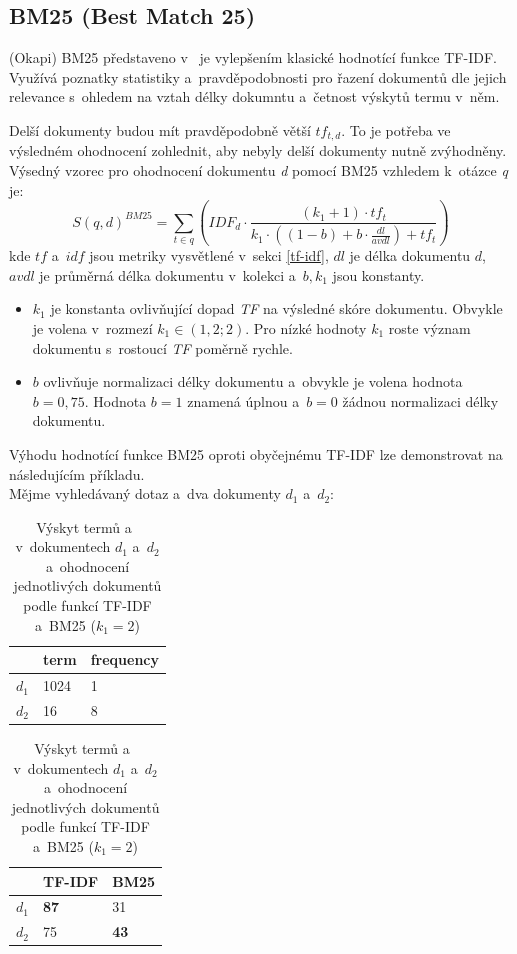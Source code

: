 \subsection{BM25 (Best Match 25)}
\label{bm25}
(Okapi) BM25 představeno v~\cite{bm25} je vylepšením klasické hodnotící funkce TF-IDF. Využívá poznatky statistiky a~pravděpodobnosti pro řazení dokumentů dle jejich relevance s~ohledem na vztah délky dokumntu a~četnost výskytů termu v~něm.\par
Delší dokumenty budou mít pravděpodobně větší $tf_{t,d}$. To je potřeba ve výsledném ohodnocení zohlednit, aby nebyly delší dokumenty nutně zvýhodněny.
Výsedný vzorec pro ohodnocení dokumentu \emph{d} pomocí BM25 vzhledem k~otázce \emph{q} je:
\begin{equation}
    S(q,d)^{BM25} = \sum_{t \in q} \left(IDF_d \cdot \frac{(k_1+1)\cdot tf_t}{k_1\cdot ((1-b)+b \cdot \frac{dl}{avdl}) + tf_t}\right)
\end{equation}
kde $tf$ a~$idf$ jsou metriky vysvětlené v~sekci \ref{tf-idf}, $dl$ je délka dokumentu $d$, $avdl$ je průměrná délka dokumentu v~kolekci a~$b,k_1$ jsou konstanty.
\begin{itemize}
    \item $k_1$ je konstanta ovlivňující dopad \emph{TF} na výsledné skóre dokumentu. Obvykle je volena v~rozmezí $k_1\in(1,2 ;2)$. Pro nízké hodnoty $k_1$ roste význam dokumentu s~rostoucí \emph{TF} poměrně rychle.
    \item $b$ ovlivňuje normalizaci délky dokumentu a~obvykle je volena hodnota $b=0,75$. Hodnota $b=1$ znamená úplnou a~$b=0$ žádnou normalizaci délky dokumentu.
\end{itemize}

Výhodu hodnotící funkce BM25 oproti obyčejnému TF-IDF lze demonstrovat na následujícím příkladu.\\ \medskip
Mějme vyhledávaný dotaz  a~dva dokumenty $d_1$ a~$d_2$:\par

\begin{table}[H]
\centering
\begin{tabular}{|c|l|l|}
\hline
      & term & frequency \\ \hline
$d_1$ & 1024 & 1         \\ \hline
$d_2$ & 16   & 8         \\ \hline
\end{tabular}
\begin{tabular}{|c|l|l|}
\hline
      & \textbf{TF-IDF} & \textbf{BM25} \\ \hline
$d_1$ & \textbf{87} & 31         \\ \hline
$d_2$ & 75 & \textbf{43}         \\ \hline
\end{tabular}
\caption{Výskyt termů  a~ v~dokumentech $d_1$ a~$d_2$ a~ohodnocení jednotlivých dokumentů podle funkcí TF-IDF a~BM25 ($k_1 = 2$)}
\label{tab:tf}
\end{table}


